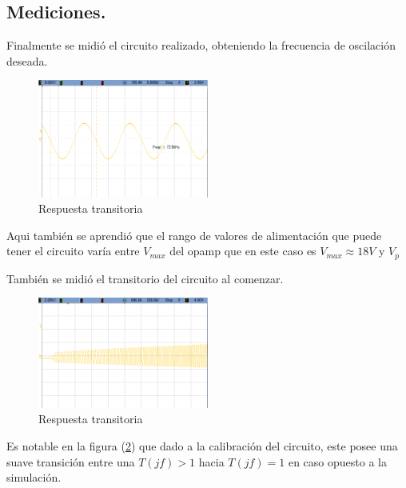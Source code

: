 \subsection{Mediciones.}
Finalmente se midió el circuito realizado, obteniendo la frecuencia de oscilación deseada.
\begin{figure}[H]
	\centering
	\includegraphics[width=0.5\textwidth]{Imagenes-Ej1/oscilador.png}
	\caption{Respuesta transitoria}
	\label{fig:trans}
\end{figure}
Aqui también se aprendió que el rango de valores de alimentación que puede tener el circuito varía entre $V_{max}$ del opamp que en este caso es $V_{max}\approx 18V$ y $V_p$

También se midió el transitorio del circuito al comenzar.
\begin{figure}[H]
	\centering
	\includegraphics[width=0.5\textwidth]{Imagenes-Ej1/osciladorstep.png}
	\caption{Respuesta transitoria}
	\label{fig:transStep}
\end{figure}
Es notable en la figura (\ref{fig:transStep}) que dado a la calibración del circuito, este posee una suave transición entre una $T(jf)>1$ hacia $T(jf) = 1$ en caso opuesto a la simulación.



